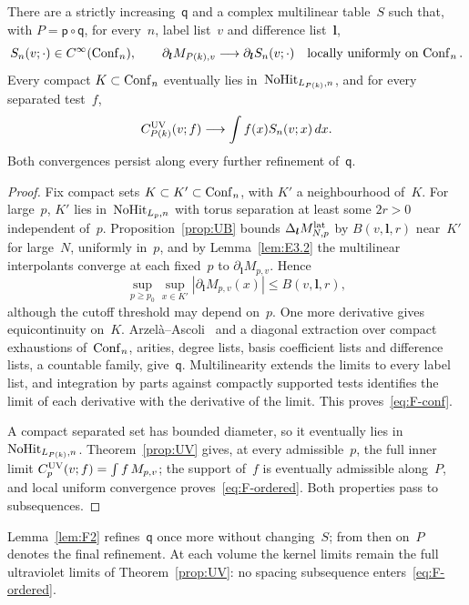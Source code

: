 \begin{lemma}\label{lem:F1}
There are a strictly increasing~$\mathsf q$ and a complex multilinear table~$S$ such that, with $P=\mathsf p\circ\mathsf q$, for every~$n$, label list~$v$ and difference list~$\boldsymbol l$,
\begin{equation}\label{eq:F-conf}
S_n(v;\cdot)\in C^\infty(\mathrm{Conf}_{n}),\qquad
\partial_{\boldsymbol l}M_{P(k),v}\longrightarrow
\partial_{\boldsymbol l}S_n(v;\cdot)
\quad\text{locally uniformly on }\mathrm{Conf}_{n}\,.
\end{equation}
Every compact $K\subset\mathrm{Conf}_{n}$ eventually lies in~$\mathrm{NoHit}_{L_{P(k)},n}$, and for every separated test~$f$,
\begin{equation}\label{eq:F-ordered}
C_{P(k)}^{\rm UV}(v;f)\longrightarrow\int f(x)S_n(v;x)\,dx.
\end{equation}
Both convergences persist along every further refinement of~$\mathsf q$.
\end{lemma}
\begin{proof}
Fix compact sets $K\subset K'\subset\mathrm{Conf}_{n}$, with $K'$ a neighbourhood of~$K$. For large~$p$, $K'$ lies in~$\mathrm{NoHit}_{L_p,n}$ with torus separation at least some $2r>0$ independent of~$p$. Proposition~\ref{prop:UB} bounds $\Delta_{\boldsymbol l}M^{\mathrm{lat}}_{N,p}$ by $B(v,\boldsymbol l,r)$ near~$K'$ for large~$N$, uniformly in~$p$, and by Lemma~\ref{lem:E3.2} the multilinear interpolants converge at each fixed~$p$ to $\partial_{\boldsymbol l}M_{p,v}$. Hence
\begin{equation}\label{eq:F-local}
\sup_{p\ge p_0}\sup_{x\in K'}|\partial_{\boldsymbol l}M_{p,v}(x)|
\le B(v,\boldsymbol l,r),
\end{equation}
although the cutoff threshold may depend on~$p$. One more derivative gives equicontinuity on~$K$. Arzelà--Ascoli~\cite[Theorem~7.25]{Rudin1976} and a diagonal extraction over compact exhaustions of~$\mathrm{Conf}_{n}$, arities, degree lists, basis coefficient lists and difference lists, a countable family, give~$\mathsf q$. Multilinearity extends the limits to every label list, and integration by parts against compactly supported tests identifies the limit of each derivative with the derivative of the limit. This proves~\eqref{eq:F-conf}.

A compact separated set has bounded diameter, so it eventually lies in~$\mathrm{NoHit}_{L_{P(k)},n}$. Theorem~\ref{prop:UV} gives, at every admissible~$p$, the full inner limit $C_p^{\rm UV}(v;f)=\int f\,M_{p,v}$; the support of~$f$ is eventually admissible along~$P$, and local uniform convergence proves~\eqref{eq:F-ordered}. Both properties pass to subsequences.
\end{proof}
Lemma~\ref{lem:F2} refines~$\mathsf q$ once more without changing~$S$; from then on~$P$ denotes the final refinement. At each volume the kernel limits remain the full ultraviolet limits of Theorem~\ref{prop:UV}: no spacing subsequence enters~\eqref{eq:F-ordered}.

